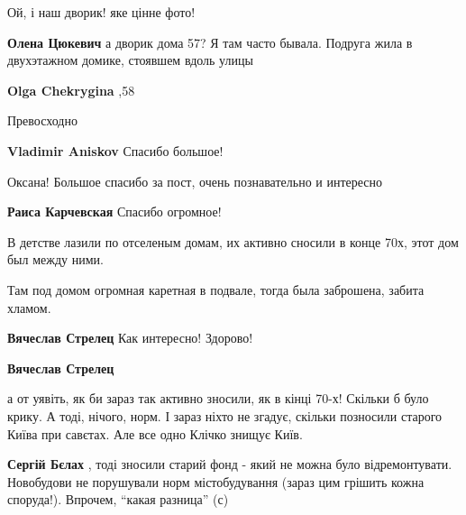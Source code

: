 
 
 
 
 
\zzSecCmt

\begin{itemize} %

Ой, і наш дворик! яке цінне фото!

\begin{itemize} %
\textbf{Олена Цюкевич} а дворик дома 57? Я там часто бывала. Подруга жила в двухэтажном домике, стоявшем вдоль улицы

\textbf{Olga Chekrygina} ,58
\end{itemize} %

Превосходно

\textbf{Vladimir Aniskov} Спасибо большое!

Оксана!
Большое спасибо за пост, очень познавательно и интересно

\textbf{Раиса Карчевская} Спасибо огромное!


В детстве лазили по отселеным домам, их активно сносили в конце 70х, этот дом
был между ними.

Там под домом огромная каретная в подвале, тогда была заброшена, забита хламом.

\begin{itemize} %
\textbf{Вячеслав Стрелец} Как интересно! Здорово!

\textbf{Вячеслав Стрелец} 

а от уявіть, як би зараз так активно зносили, як в кінці 70-х! Скільки б було
крику. А тоді, нічого, норм. І зараз ніхто не згадує, скільки позносили старого
Київа при савєтах. Але все одно Клічко знищує Київ.

\begin{itemize} %
\textbf{Сергій Бєлах} , тоді зносили старий фонд - який не можна було відремонтувати. Новобудови не порушували норм містобудування (зараз цим грішить кожна споруда!).
Впрочем, \enquote{какая разница} (с)


\end{itemize}
\end{itemize}
\end{itemize}
